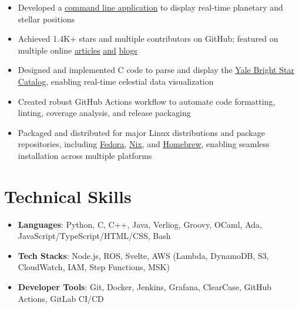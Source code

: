 \documentclass[letterpaper,10pt]{article}
\newcommand{\itemsBegin}{
    \begin{itemize}[leftmargin=0.2in, labelsep=0.05in, itemsep=0pt, parsep=1pt, topsep=0pt, partopsep=0pt]
    \small
}
\newcommand{\itemsEnd}{\end{itemize}}
\begin{document}
    \itemsBegin{}
        \item Developed a
        \href{https://github.com/da-luce/astroterm}{\underline{command line application}}
        to display real-time planetary and stellar positions
        \item Achieved 1.4K+ stars and multiple contributors on GitHub; featured on multiple online
        \href{https://www.linuxlinks.com/astroterm-terminal-based-star-map/}{\underline{articles}}
        \href{https://github.com/toolleeo/awesome-cli-apps-in-a-csv?tab=readme-ov-file#graphics}{\underline{and}}
        \href{https://terminaltrove.com/astroterm/}{\underline{blogs}}
        \item Designed and implemented C code to parse and display the
        \href{https://tdc-www.harvard.edu/catalogs/bsc5.html}{\underline{Yale Bright Star Catalog}},
        enabling real-time celestial data visualization
        \item Created robust GitHub Actions workflow to automate code formatting, linting, coverage analysis, and release packaging
        \item Packaged and distributed for major Linux distributions and package repositories, including
        \href{https://packages.fedoraproject.org/pkgs/astroterm/astroterm/index.html}{\underline{Fedora}},
        \href{https://search.nixos.org/packages?channel=unstable&show=astroterm&from=0&size=50&sort=relevance&type=packages&query=astroterm}{\underline{Nix}}, and
        \href{https://formulae.brew.sh/formula/astroterm#default}{\underline{Homebrew}},
        enabling seamless installation across multiple platforms
    \itemsEnd{}

\section{Technical Skills}

    \itemsBegin{}
        \item \textbf{Languages}{: Python, C, C++, Java, Verliog, Groovy, OCaml, Ada, JavaScript/TypeScript/HTML/CSS, Bash}
        \item \textbf{Tech Stacks}{: Node.js, ROS, Svelte, AWS (Lambda, DynamoDB, S3, CloudWatch, IAM, Step Functions, MSK)}
        \item \textbf{Developer Tools}{: Git, Docker, Jenkins, Grafana, ClearCase, GitHub Actions, GitLab CI/CD }
    \itemsEnd{}
\end{document}
